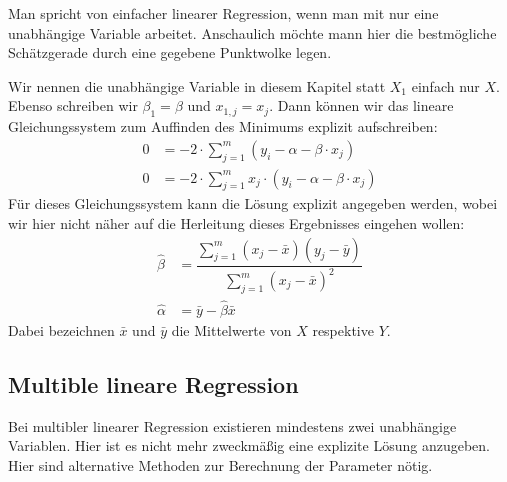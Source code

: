 Man spricht von einfacher linearer Regression, wenn man mit nur eine unabhängige Variable arbeitet. Anschaulich möchte mann hier die bestmögliche Schätzgerade durch eine gegebene Punktwolke legen.

Wir nennen die unabhängige Variable in diesem Kapitel statt $X_1$ einfach nur $X$. Ebenso schreiben wir $\beta_1 = \beta$ und $x_{1, j} = x_j$. Dann können wir das lineare Gleichungssystem zum Auffinden des Minimums explizit aufschreiben:
\begin{align*}
    0 &= - 2 \cdot \sum_{j=1}^m (y_i - \alpha - \beta \cdot x_{j})\\
    0 &= - 2 \cdot \sum_{j=1}^m x_j \cdot (y_i - \alpha - \beta \cdot x_{j})
\end{align*}
Für dieses Gleichungssystem kann die Lösung explizit angegeben werden, wobei wir hier nicht näher auf die Herleitung dieses Ergebnisses eingehen wollen:
\begin{align*}
    \hat\beta &= \dfrac{\sum\limits_{j=1}^m (x_j - \bar{x})(y_j - \bar{y})}{\sum\limits_{j=1}^m (x_j - \bar{x})^2}\\
    \hat\alpha &= \bar{y} - \hat\beta \bar{x}
\end{align*}
Dabei bezeichnen $\bar{x}$ und $\bar{y}$ die Mittelwerte von $X$ respektive $Y$.

\subsection{Multible lineare Regression}

Bei multibler linearer Regression existieren mindestens zwei unabhängige Variablen. Hier ist es nicht mehr zweckmäßig eine explizite Lösung anzugeben. Hier sind alternative Methoden zur Berechnung der Parameter nötig.

